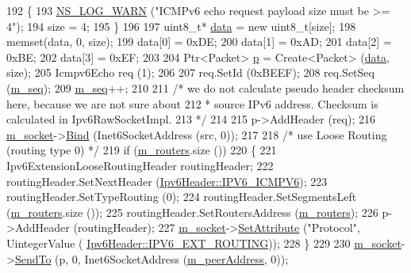 \begin{DoxyCode}
192     \{
193       \hyperlink{group__logging_gade7208b4009cdf0e25783cd26766f559}{NS\_LOG\_WARN} (\textcolor{stringliteral}{"ICMPv6 echo request payload size must be >= 4"});
194       size = 4;
195     \}
196 
197   uint8\_t* \hyperlink{topology-example-sim_8cc_a26c65296e316af77b787dc77469bb2a4}{data} = \textcolor{keyword}{new} uint8\_t[size];
198   memset(data, 0, size);
199   data[0] = 0xDE;
200   data[1] = 0xAD;
201   data[2] = 0xBE;
202   data[3] = 0xEF;
203 
204   Ptr<Packet> \hyperlink{lte__link__budget_8m_ac9de518908a968428863f829398a4e62}{p} = Create<Packet> (\hyperlink{topology-example-sim_8cc_a26c65296e316af77b787dc77469bb2a4}{data}, size);
205   Icmpv6Echo req (1);
206 
207   req.SetId (0xBEEF);
208   req.SetSeq (\hyperlink{classns3_1_1Ping6_a951109c23d5e308328e22f41ec2ce3de}{m\_seq});
209   \hyperlink{classns3_1_1Ping6_a951109c23d5e308328e22f41ec2ce3de}{m\_seq}++;
210 
211   \textcolor{comment}{/* we do not calculate pseudo header checksum here, because we are not sure about }
212 \textcolor{comment}{   * source IPv6 address. Checksum is calculated in Ipv6RawSocketImpl.}
213 \textcolor{comment}{   */}
214 
215   p->AddHeader (req);
216   \hyperlink{classns3_1_1Ping6_a906684b14d88122f2a16b4a9d241194d}{m\_socket}->\hyperlink{classns3_1_1Socket_ada93439a43de2028b5a8fc6621dad482}{Bind} (Inet6SocketAddress (src, 0));
217 
218   \textcolor{comment}{/* use Loose Routing (routing type 0) */}
219   \textcolor{keywordflow}{if} (\hyperlink{classns3_1_1Ping6_a6f3aa884473637142689ee9bae07394f}{m\_routers}.size ())
220     \{
221       Ipv6ExtensionLooseRoutingHeader routingHeader;
222       routingHeader.SetNextHeader (\hyperlink{classns3_1_1Ipv6Header_a226429221a066c5e3b1f260caf27d1e9a5a1ba2c977ece2a8089761a3bd2e5478}{Ipv6Header::IPV6\_ICMPV6});
223       routingHeader.SetTypeRouting (0);
224       routingHeader.SetSegmentsLeft (\hyperlink{classns3_1_1Ping6_a6f3aa884473637142689ee9bae07394f}{m\_routers}.size ());
225       routingHeader.SetRoutersAddress (\hyperlink{classns3_1_1Ping6_a6f3aa884473637142689ee9bae07394f}{m\_routers});
226       p->AddHeader (routingHeader);
227       \hyperlink{classns3_1_1Ping6_a906684b14d88122f2a16b4a9d241194d}{m\_socket}->\hyperlink{classns3_1_1ObjectBase_ac60245d3ea4123bbc9b1d391f1f6592f}{SetAttribute} (\textcolor{stringliteral}{"Protocol"}, UintegerValue (
      \hyperlink{classns3_1_1Ipv6Header_a226429221a066c5e3b1f260caf27d1e9a4f6f9116305705bc2b3d04ff5c4bd2a8}{Ipv6Header::IPV6\_EXT\_ROUTING}));
228     \}
229 
230   \hyperlink{classns3_1_1Ping6_a906684b14d88122f2a16b4a9d241194d}{m\_socket}->\hyperlink{classns3_1_1Socket_af898fce6a58e0dbba23c1c6de1d4220e}{SendTo} (p, 0, Inet6SocketAddress (\hyperlink{classns3_1_1Ping6_ad0b9bf2e656c09ab204d51d0a04e4b25}{m\_peerAddress}, 0));

\end{DoxyCode}
